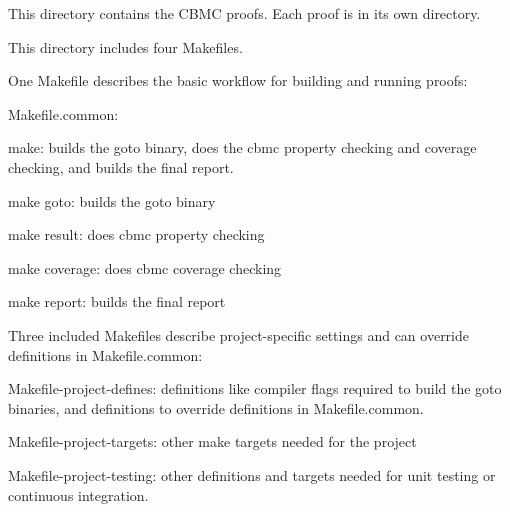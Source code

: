This directory contains the CBMC proofs. Each proof is in its own directory.

This directory includes four Makefiles.

One Makefile describes the basic workflow for building and running proofs\+:


\begin{DoxyItemize}
\item Makefile.\+common\+:
\begin{DoxyItemize}
\item make\+: builds the goto binary, does the cbmc property checking and coverage checking, and builds the final report.
\item make goto\+: builds the goto binary
\item make result\+: does cbmc property checking
\item make coverage\+: does cbmc coverage checking
\item make report\+: builds the final report
\end{DoxyItemize}
\end{DoxyItemize}

Three included Makefiles describe project-\/specific settings and can override definitions in Makefile.\+common\+:


\begin{DoxyItemize}
\item Makefile-\/project-\/defines\+: definitions like compiler flags required to build the goto binaries, and definitions to override definitions in Makefile.\+common.
\item Makefile-\/project-\/targets\+: other make targets needed for the project
\item Makefile-\/project-\/testing\+: other definitions and targets needed for unit testing or continuous integration. 
\end{DoxyItemize}